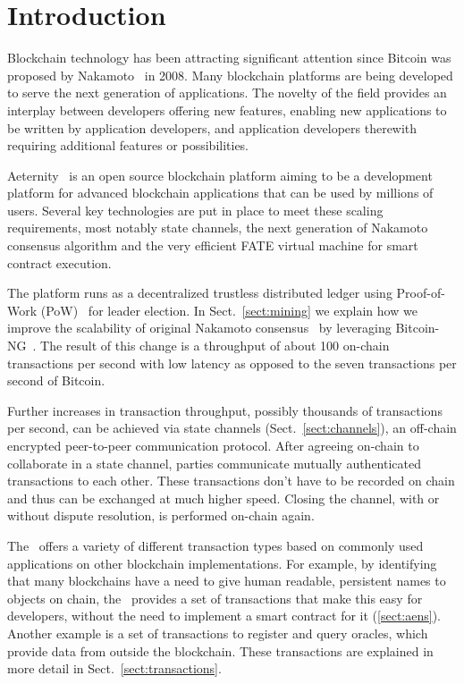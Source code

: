 \section{Introduction}

Blockchain technology has been attracting significant attention since Bitcoin
was proposed by Nakamoto~\cite{SN} in 2008.
Many blockchain platforms are being developed to serve the next generation of
applications. The novelty of the field provides an interplay between developers
offering new features, enabling new applications to be written by application
developers, and application developers therewith requiring additional features
or possibilities.

Aeternity~\cite{AE,UlfWigerCodeMesh2018} is an open source blockchain
platform aiming to be a development platform for advanced blockchain
applications that can be used by millions of users. Several key technologies
are put in place to meet these scaling requirements, most notably state
channels, the next generation of Nakamoto consensus algorithm and the very
efficient FATE virtual machine for smart contract execution.

The platform runs as a decentralized trustless distributed ledger using
Proof-of-Work (PoW)~\cite{dwork1992pricing,back1997hashcash,Tromp2015CuckooCA}
for leader election.
In Sect.~\ref{sect:mining} we explain how we improve the scalability of
original Nakamoto consensus~\cite{SN} by leveraging
Bitcoin-NG~\cite{Eyal:2016:BSB:2930611.2930615}. The result of this change
is a throughput of about 100 on-chain transactions per second with
low latency as opposed to the seven transactions per second of Bitcoin.

Further increases in transaction throughput, possibly thousands of
transactions per second, can be achieved via state channels (Sect.\
\ref{sect:channels}),
an off-chain encrypted peer-to-peer communication protocol. After
agreeing on-chain to collaborate in a state channel, parties communicate
mutually authenticated transactions to each other. These transactions don't
have to be recorded on chain and thus can be exchanged at much higher
speed. Closing the channel, with or without dispute resolution, is performed
on-chain again.

The \blockchain\ offers a variety of different transaction types
based on commonly used applications on other blockchain implementations.
For example, by identifying that many blockchains have a need to give human
readable, persistent names to objects on chain, the \blockchain\ provides a
set of transactions that make this easy for developers, without the need to
implement a smart contract for it (\ref{sect:aens}). Another example is a set
of transactions to register and query oracles, which provide data from outside
the blockchain.
These transactions are explained in more detail in Sect.~\ref{sect:transactions}.

